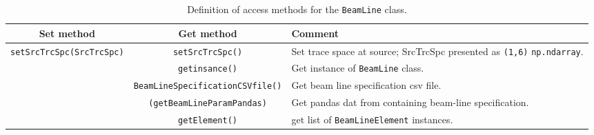 \begin{sidewaystable}[h]
  \caption{
    Definition of access methods for the \texttt{BeamLine}
    class. 
  }
  \label{Tab:BL:AccessMethods}
  \begin{center}
    \begin{tabular}{|c|c|p{10cm}|}
      \hline
      \textbf{Set method} & \textbf{Get method}  & \textbf{Comment}                                                              \\
      \hline
      \texttt{setSrcTrcSpc(SrcTrcSpc)} & \texttt{setSrcTrcSpc()} & Set trace space at source; SrcTrcSpc presented as \texttt{(1,6)}
                                                                   \texttt{np.ndarray}.                                          \\
                                         & \texttt{getinsance()} & Get instance of \texttt{BeamLine} class.                        \\
                       & \texttt{BeamLineSpecificationCSVfile()} & Get beam line specification csv file.                           \\
                             & \texttt{(getBeamLineParamPandas)} & Get pandas dat from containing beam-line specification.         \\
                                         & \texttt{getElement()} & get list of \texttt{BeamLineElement} instances.                 \\
      \hline
    \end{tabular}
  \end{center}
\end{sidewaystable}

